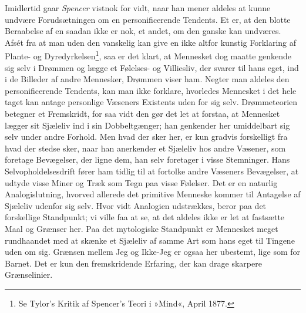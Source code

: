 \documentclass[12pt,a4paper,openany]{book}
\begin{document}
Imidlertid gaar \emph{Spencer} vistnok for vidt, naar han mener aldeles
at kunne undvære Forudsætningen om en personificerende Tendents. Et er,
at den blotte Beraabelse af en saadan ikke er nok, et andet, om den
ganske kan undværes. Afsét fra at man uden den vanskelig kan give en
ikke altfor kunstig Forklaring af Plante- og
Dyredyrkelsen\footnote[1]{Se Tylor’s Kritik af Spencer’s Teori i »Mind«,
April 1877.}, saa er det klart, at Mennesket dog maatte genkende sig
selv i Drømmen og lægge et Følelses- og Villiesliv, der svarer til hans
eget, ind i de Billeder af andre Mennesker, Drømmen viser ham. Negter
man aldeles den personificerende Tendents, kan man ikke forklare,
hvorledes Mennesket i det hele taget kan antage personlige Væseners
Existents uden for sig selv. Drømmeteorien betegner et Fremskridt, for
saa vidt den gør det let at forstaa, at Mennesket lægger sit Sjæleliv
ind i sin Dobbeltgænger; han genkender her umiddelbart sig selv under
andre Forhold. Men hvad der sker her, er kun gradvis forskelligt fra
hvad der stedse sker, naar han anerkender et Sjæleliv hos andre Væsener,
som foretage Bevægelser, der ligne dem, han selv foretager i visse
Stemninger. Hans Selvopholdelsesdrift fører ham tidlig til at fortolke
andre Væseners Bevægelser, at udtyde visse Miner og Træk som Tegn paa
visse Følelser. Det er en naturlig Analogislutning, hvorved allerede det
primitive Menneske kommer til Antagelse af Sjæleliv udenfor sig selv.
Hvor vidt Analogien udstrækkes, beror paa det forskellige Standpunkt; vi
ville faa at se, at det aldeles ikke er let at fastsætte Maal og Grænser
her. Paa det mytologiske Standpunkt er Mennesket meget rundhaandet med
at skænke et Sjæleliv af samme Art som hans eget til Tingene uden om
sig. Grænsen mellem Jeg og Ikke-Jeg er ogsaa her ubestemt, lige som for
Barnet. Det er kun den fremskridende Erfaring, der kan drage skarpere
Grænselinier.
\end{document}
